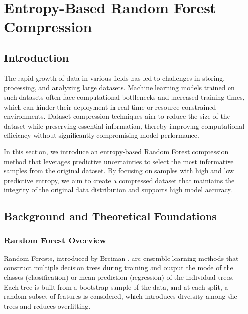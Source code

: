 \documentclass{article}
\author{}
\date{}
\begin{document}
\maketitle {}

\section{Entropy-Based Random Forest Compression}

\subsection{Introduction}

The rapid growth of data in various fields has led to challenges in storing, processing, and analyzing large datasets. Machine learning models trained on such datasets often face computational bottlenecks and increased training times, which can hinder their deployment in real-time or resource-constrained environments. Dataset compression techniques aim to reduce the size of the dataset while preserving essential information, thereby improving computational efficiency without significantly compromising model performance.

In this section, we introduce an entropy-based Random Forest compression method that leverages predictive uncertainties to select the most informative samples from the original dataset. By focusing on samples with high and low predictive entropy, we aim to create a compressed dataset that maintains the integrity of the original data distribution and supports high model accuracy.

\subsection{Background and Theoretical Foundations}

\subsubsection{Random Forest Overview}

Random Forests, introduced by Breiman \cite{breiman2001random}, are ensemble learning methods that construct multiple decision trees during training and output the mode of the classes (classification) or mean prediction (regression) of the individual trees. Each tree is built from a bootstrap sample of the data, and at each split, a random subset of features is considered, which introduces diversity among the trees and reduces overfitting.
\end{document}
